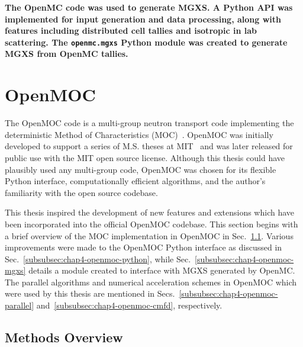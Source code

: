 \begin{emphbox}
\textbf{The OpenMC code was used to generate \ac{MGXS}. A Python \ac{API} was implemented for input generation and data processing, along with features including distributed cell tallies and isotropic in lab scattering. The \texttt{openmc.mgxs} Python module was created to generate \ac{MGXS} from OpenMC tallies.}
\end{emphbox}


\section{OpenMOC}
\label{sec:chap4-openmoc}

The OpenMOC code is a multi-group neutron transport code implementing the deterministic Method of Characteristics (MOC)~\cite{boyd2014openmoc}. OpenMOC was initially developed to support a series of M.S. theses at MIT~\cite{li2013ms,boyd2014ms,shaner2014ms} and was later released for public use with the MIT open source license. Although this thesis could have plausibly used any multi-group code, OpenMOC was chosen for its flexible Python interface, computationally efficient algorithms, and the author's familiarity with the open source codebase.


This thesis inspired the development of new features and extensions which have been incorporated into the official OpenMOC codebase. This section begins with a brief overview of the \ac{MOC} implementation in OpenMOC in Sec.~\ref{subsubsec:chap4-openmoc-overview}. Various improvements were made to the OpenMOC Python interface as discussed in Sec.~\ref{subsubsec:chap4-openmoc-python}, while Sec.~\ref{subsubsec:chap4-openmoc-mgxs} details a module created to interface with \ac{MGXS} generated by OpenMC. The parallel algorithms and numerical acceleration schemes in OpenMOC which were used by this thesis are mentioned in Secs.~\ref{subsubsec:chap4-openmoc-parallel} and~\ref{subsubsec:chap4-openmoc-cmfd}, respectively.


\subsection{Methods Overview}
\label{subsubsec:chap4-openmoc-overview}


